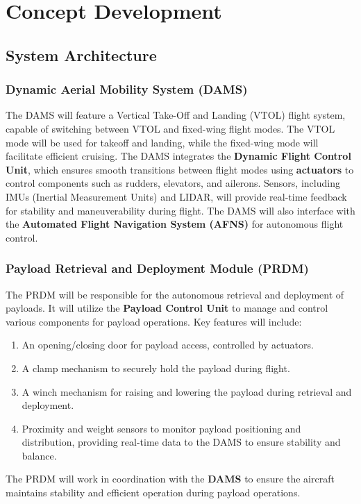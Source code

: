 \documentclass[12pt]{article}
\begin{document}
\section{Concept Development}
\subsection{System Architecture}

\subsubsection{Dynamic Aerial Mobility System (DAMS)}
The DAMS will feature a Vertical Take-Off and Landing (VTOL) flight system, capable of switching between VTOL and fixed-wing flight modes. The VTOL mode will be used for takeoff and landing, while the fixed-wing mode will facilitate efficient cruising. The DAMS integrates the \textbf{Dynamic Flight Control Unit}, which ensures smooth transitions between flight modes using \textbf{actuators} to control components such as rudders, elevators, and ailerons. Sensors, including IMUs (Inertial Measurement Units) and LIDAR, will provide real-time feedback for stability and maneuverability during flight. The DAMS will also interface with the \textbf{Automated Flight Navigation System (AFNS)} for autonomous flight control.

\subsubsection{Payload Retrieval and Deployment Module (PRDM)}
The PRDM will be responsible for the autonomous retrieval and deployment of payloads. It will utilize the \textbf{Payload Control Unit} to manage and control various components for payload operations. Key features will include:
\begin{enumerate}
    \item An opening/closing door for payload access, controlled by actuators.
    \item A clamp mechanism to securely hold the payload during flight.
    \item A winch mechanism for raising and lowering the payload during retrieval and deployment.
    \item Proximity and weight sensors to monitor payload positioning and distribution, providing real-time data to the DAMS to ensure stability and balance.
\end{enumerate}
The PRDM will work in coordination with the \textbf{DAMS} to ensure the aircraft maintains stability and efficient operation during payload operations.
\end{document}
